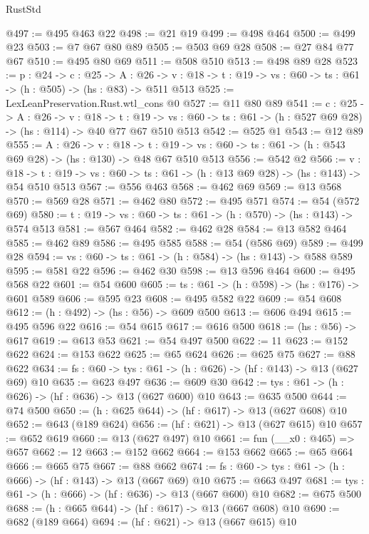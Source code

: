 \begin{lexlean}{RustStd}
\begin{coremodule}
{\begin{coremodule}
{{{{{@497 := @495 @463 @22
@498 := @21 @19
@499 := @498 @464
@500 := @499 @23
@503 := @7 @67 @80 @89
@505 := @503 @69 @28
@508 := @27 @84 @77 @67
@510 := @495 @80 @69
@511 := @508 @510
@513 := @498 @89 @28
@523 := {p : @24} ->
  {c : @25} ->
  {A : @26} ->
  {v : @18} -> {t : @19} -> {vs : @60} -> {ts : @61} -> (h : @505) -> (hs : @83) -> @511 @513
@525 := LexLeanPreservation.Rust.wtl_cons @0
@527 := @11 @80 @89
@541 := {c : @25} ->
  {A : @26} ->
  {v : @18} ->
  {t : @19} ->
  {vs : @60} -> {ts : @61} -> (h : @527 @69 @28) -> (hs : @114) -> @40 @77 @67 @510 @513
@542 := @525 @1
@543 := @12 @89
@555 := {A : @26} ->
  {v : @18} ->
  {t : @19} -> {vs : @60} -> {ts : @61} -> (h : @543 @69 @28) -> (hs : @130) -> @48 @67 @510 @513
@556 := @542 @2
@566 := {v : @18} ->
  {t : @19} -> {vs : @60} -> {ts : @61} -> (h : @13 @69 @28) -> (hs : @143) -> @54 @510 @513
@567 := @556 @463
@568 := @462 @69
@569 := @13 @568
@570 := @569 @28
@571 := @462 @80
@572 := @495 @571
@574 := @54 (@572 @69)
@580 := {t : @19} -> {vs : @60} -> {ts : @61} -> (h : @570) -> (hs : @143) -> @574 @513
@581 := @567 @464
@582 := @462 @28
@584 := @13 @582 @464
@585 := @462 @89
@586 := @495 @585
@588 := @54 (@586 @69)
@589 := @499 @28
@594 := {vs : @60} -> {ts : @61} -> (h : @584) -> (hs : @143) -> @588 @589
@595 := @581 @22
@596 := @462 @30
@598 := @13 @596 @464
@600 := @495 @568 @22
@601 := @54 @600
@605 := {ts : @61} -> (h : @598) -> (hs : @176) -> @601 @589
@606 := @595 @23
@608 := @495 @582 @22
@609 := @54 @608
@612 := (h : @492) -> (hs : @56) -> @609 @500
@613 := @606 @494
@615 := @495 @596 @22
@616 := @54 @615
@617 := @616 @500
@618 := (hs : @56) -> @617
@619 := @613 @53
@621 := @54 @497 @500
@622 := 11
@623 := @152 @622
@624 := @153 @622
@625 := @65 @624
@626 := @625 @75
@627 := @88 @622
@634 := {fs : @60} -> {tys : @61} -> (h : @626) -> (hf : @143) -> @13 (@627 @69) @10
@635 := @623 @497
@636 := @609 @30
@642 := {tys : @61} -> (h : @626) -> (hf : @636) -> @13 (@627 @600) @10
@643 := @635 @500
@644 := @74 @500
@650 := (h : @625 @644) -> (hf : @617) -> @13 (@627 @608) @10
@652 := @643 (@189 @624)
@656 := (hf : @621) -> @13 (@627 @615) @10
@657 := @652 @619
@660 := @13 (@627 @497) @10
@661 := fun (__x0 : @465) => @657
@662 := 12
@663 := @152 @662
@664 := @153 @662
@665 := @65 @664
@666 := @665 @75
@667 := @88 @662
@674 := {fs : @60} -> {tys : @61} -> (h : @666) -> (hf : @143) -> @13 (@667 @69) @10
@675 := @663 @497
@681 := {tys : @61} -> (h : @666) -> (hf : @636) -> @13 (@667 @600) @10
@682 := @675 @500
@688 := (h : @665 @644) -> (hf : @617) -> @13 (@667 @608) @10
@690 := @682 (@189 @664)
@694 := (hf : @621) -> @13 (@667 @615) @10
}}}}}
\end{coremodule}}
\end{coremodule}
\end{lexlean}
